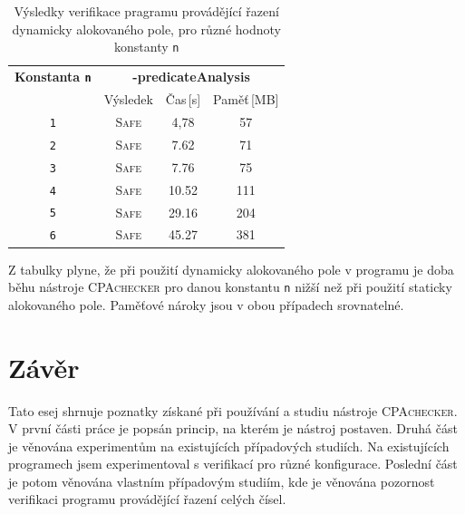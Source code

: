 \documentclass[a4paper,12pt]{article}
\begin{document}
\begin{table}[h!]
\renewcommand{\arraystretch}{1.2}
\begin{center}
  \begin{tabular}{| c | c  c  c |}
    \hline
   \multicolumn{1}{|c|}{\bf Konstanta \texttt{n}} & \multicolumn{3}{c|}{\small\bf -predicateAnalysis}  \\
     &  Výsledek & Čas\,[s] & Paměť\,[MB] \\
    \hline\hline
    {\texttt{1}} & \textsc{Safe} & 4,78 & 57 \\\hline
    {\texttt{2}} & \textsc{Safe} & 7.62 & 71 \\ \hline
    {\texttt{3}} & \textsc{Safe} & 7.76 & 75 \\ \hline
    {\texttt{4}} & \textsc{Safe} & 10.52 & 111 \\ \hline
    {\texttt{5}} & \textsc{Safe} & 29.16 & 204 \\ \hline
    {\texttt{6}} & \textsc{Safe} & 45.27 & 381 \\
    \hline
  \end{tabular}
\end{center}
\caption{Výsledky verifikace pragramu provádějící řazení dynamicky alokovaného pole, pro různé hodnoty konstanty \texttt{n}}
\label{tab:mem}
\end{table}

Z tabulky plyne, že při použití dynamicky alokovaného pole v programu je doba běhu nástroje \textsc{CPAchecker} pro danou konstantu \texttt{n} nižší než při použití
staticky alokovaného pole. Paměťové nároky jsou v obou případech srovnatelné.

\section{Závěr}
Tato esej shrnuje poznatky získané při používání a studiu nástroje \textsc{CPAchecker}. V první části práce je
popsán princip, na kterém je nástroj postaven. Druhá část je věnována experimentům na existujících
případových studiích. Na existujících programech jsem experimentoval s verifikací pro různé konfigurace. Poslední část 
je potom věnována vlastním případovým studiím, kde je věnována pozornost verifikaci programu provádějící řazení celých čísel.


{}
\end{document}

